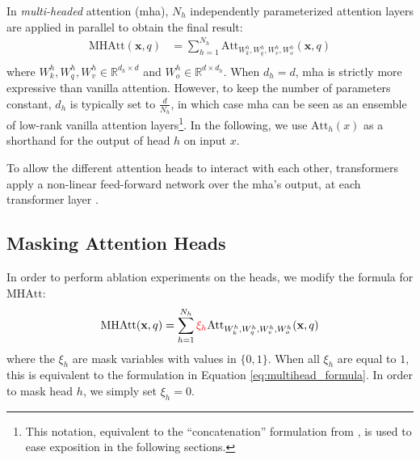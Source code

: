 In \emph{multi-headed} attention (\ac{mha}), $N_h$ independently parameterized attention layers are applied in parallel to obtain the final result:
\begin{equation}
\label{eq:multihead_formula}
\begin{split}
    \text{MHAtt}(\textbf{x}, q)&=\sum_{h=1}^{N_h}\text{Att}_{W^h_k, W^h_q, W^{h}_v,W^h_o}(\textbf{x}, q)\\
\end{split}
\end{equation}
where $W^h_k, W^h_q, W^h_v\in \mathbb{R}^{d_h\times d}$ and $W^h_o\in \mathbb{R}^{d\times d_h}$. When $d_h=d$, \ac{mha} is strictly more expressive than vanilla attention. However, to keep the number of parameters constant, $d_h$ is typically set to $\frac{d}{N_h}$, in which case \ac{mha} can be seen as an ensemble of low-rank vanilla attention layers\footnote{This notation, equivalent to the ``concatenation'' formulation from \citet{vaswani2017attention}, is used to ease exposition in the following sections.}. In the following, we use $\text{Att}_h(x)$ as a shorthand for the output of head $h$ on input $x$.

To allow the different attention heads to interact with each other, transformers apply a non-linear feed-forward network over the \ac{mha}'s output, at each transformer layer \citep{vaswani2017attention}.


\subsection{Masking Attention Heads}
\label{sec:masking}

In order to perform ablation experiments on the heads, we modify the formula for $\text{MHAtt}$:
\begin{equation*}
\begin{split}
    \text{MHAtt}(\textbf{x}, q)&=\sum_{h=1}^{N_h}{\color{red}\xi_{h}}\text{Att}_{W^h_k, W^h_q, W^{h}_v,W^h_o}(\textbf{x}, q)\\
\end{split}
\end{equation*}
where the $\xi_h$ are mask variables with values in $\{0,1\}$. When all $\xi_h$ are equal to $1$, this is equivalent to the formulation in Equation \ref{eq:multihead_formula}. In order to mask head $h$, we simply set $\xi_h=0$.
